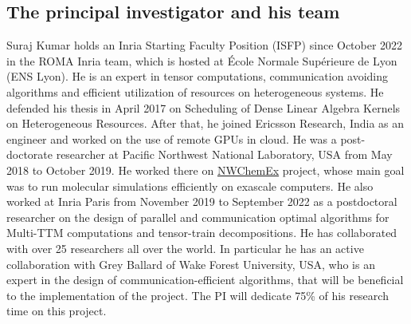 \documentclass[a4paper,11pt]{article}
\begin{document}
	
	
	\begin{table}[htb]
		\begin{center}
		\end{center}
		\caption{Human resources.}
		\label{tab:human}
	\end{table}
	
	\subsection{The principal investigator and his team}
	\label{sec:org:team}
	Suraj Kumar holds an Inria Starting Faculty Position (ISFP) since October 2022 in the ROMA Inria team, which is hosted at École Normale Supérieure de Lyon (ENS Lyon). He is an expert in tensor computations, communication avoiding algorithms and efficient utilization of resources on heterogeneous systems. He defended his thesis in April 2017 on Scheduling of Dense Linear Algebra Kernels on Heterogeneous Resources. After that, he joined Ericsson Research, India as an engineer and worked on the use of remote GPUs in cloud. He was a post-doctorate researcher at Pacific Northwest National Laboratory, USA from May 2018 to October 2019. He worked there on \href{https://www.exascaleproject.org/research-project/nwchemex}{NWChemEx} project, whose main goal was to run molecular simulations efficiently on exascale computers. He also worked at Inria Paris from November 2019 to September 2022 as a postdoctoral researcher on the design of parallel and communication optimal algorithms for Multi-TTM computations and tensor-train decompositions. He has collaborated with over 25 researchers all over the world. In particular he has an active collaboration with Grey Ballard of Wake Forest University, USA, who is an expert in the design of communication-efficient algorithms, that will be beneficial to the implementation of the project. The PI will dedicate 75\% of his research time on this project.
	
\end{document}

